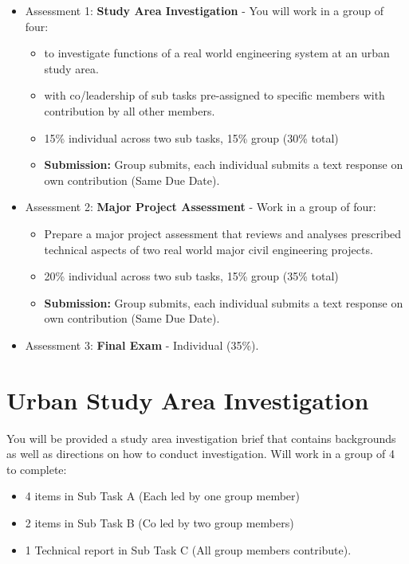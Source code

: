 \documentclass{report}
\begin{document}
	\begin{itemize}
		\item Assessment 1: \textbf{Study Area Investigation} - You will work in a group of four:
		\begin{itemize}
			\item to investigate functions of a real world engineering system at an urban study area. 
			\item with co/leadership of sub tasks pre-assigned to specific members with contribution by all other members.
			\item 15\% individual across two sub tasks, 15\% group (30\% total)
			\item \textbf{Submission:} Group submits, each individual submits a text response on own contribution (Same Due Date).
		\end{itemize}
		\item Assessment 2: \textbf{Major Project Assessment} - Work in a group of four:
		\begin{itemize}
			\item Prepare a major project assessment that reviews and analyses prescribed technical aspects of two real world major civil engineering projects.
			\item 20\% individual across two sub tasks, 15\% group (35\% total)
			\item \textbf{Submission:} Group submits, each individual submits a text response on own contribution (Same Due Date).
		\end{itemize}
		\item Assessment 3: \textbf{Final Exam} - Individual (35\%).
	\end{itemize}

	\section{Urban Study Area Investigation}
	You will be provided a study area investigation brief that contains backgrounds as well as directions on how to conduct investigation. Will work in a group of 4 to complete:

	\begin{itemize}
		\item 4 items in Sub Task A (Each led by one group member)
		\item 2 items in Sub Task B (Co led by two group members)
		\item 1 Technical report in Sub Task C (All group members contribute).
	\end{itemize}
\end{document}

